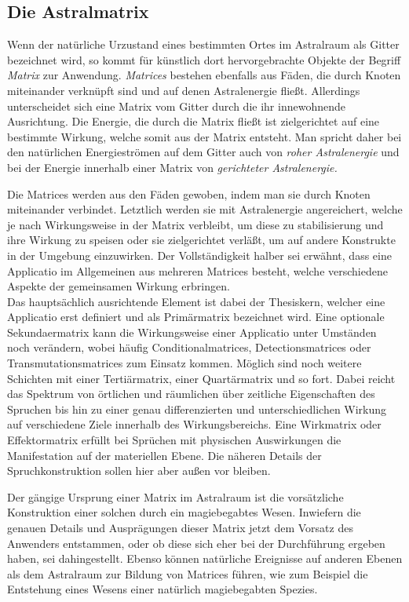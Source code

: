 \documentclass[a5paper,8pt]{book}
\begin{document}
\subsection{Die Astralmatrix}
\begin{multicols}{2}
Wenn der natürliche Urzustand eines bestimmten Ortes im Astralraum als Gitter bezeichnet wird, so kommt für
künstlich dort hervorgebrachte Objekte der Begriff \textit{Matrix} zur Anwendung. \textit{Matrices} bestehen ebenfalls aus
Fäden, die durch Knoten miteinander verknüpft sind und auf denen Astralenergie fließt. Allerdings unterscheidet sich eine Matrix
vom Gitter durch die ihr innewohnende Ausrichtung. Die Energie, die durch die Matrix fließt ist zielgerichtet auf
eine bestimmte Wirkung, welche somit aus der Matrix entsteht. Man spricht daher bei den natürlichen Energieströmen 
auf dem Gitter auch von \textit{roher Astralenergie} und bei der Energie innerhalb einer Matrix von \textit{gerichteter
Astralenergie.}

Die Matrices werden aus den Fäden gewoben, indem man sie durch Knoten miteinander verbindet. Letztlich werden sie
mit Astralenergie angereichert, welche je nach Wirkungsweise in der Matrix verbleibt, um diese zu stabilisierung und ihre
Wirkung zu speisen oder sie zielgerichtet verläßt, um auf andere Konstrukte in der Umgebung einzuwirken. Der
Vollständigkeit halber sei erwähnt, dass eine Applicatio im Allgemeinen aus mehreren Matrices besteht, welche
verschiedene Aspekte der gemeinsamen Wirkung erbringen.\\

Das hauptsächlich ausrichtende Element ist dabei der Thesiskern, welcher eine Applicatio erst definiert und als
Primärmatrix bezeichnet wird. Eine optionale Sekundaermatrix kann die Wirkungsweise einer Applicatio unter
Umständen noch verändern, wobei häufig Conditionalmatrices, Detectionsmatrices oder Transmutationsmatrices zum Einsatz
kommen. Möglich sind noch weitere Schichten mit einer Tertiärmatrix, einer Quartärmatrix und so fort. Dabei reicht das
Spektrum von örtlichen und räumlichen über zeitliche Eigenschaften des Spruchen bis hin zu einer genau differenzierten
und unterschiedlichen Wirkung auf verschiedene Ziele innerhalb des Wirkungsbereichs. Eine Wirkmatrix oder
Effektormatrix erfüllt bei Sprüchen mit physischen Auswirkungen die Manifestation auf der materiellen Ebene. Die
näheren Details der Spruchkonstruktion sollen hier aber außen vor bleiben.

Der gängige Ursprung einer Matrix im Astralraum ist die vorsätzliche Konstruktion einer solchen durch ein
magiebegabtes Wesen. Inwiefern die genauen Details und Ausprägungen dieser Matrix jetzt dem Vorsatz
des Anwenders entstammen, oder ob diese sich eher bei der Durchführung ergeben haben, sei dahingestellt. Ebenso können natürliche
Ereignisse auf anderen Ebenen als dem Astralraum zur Bildung von Matrices führen, wie zum Beispiel die Entstehung eines
Wesens einer natürlich magiebegabten Spezies.
\end{multicols}
\noindent\hrulefill
\end{document}
